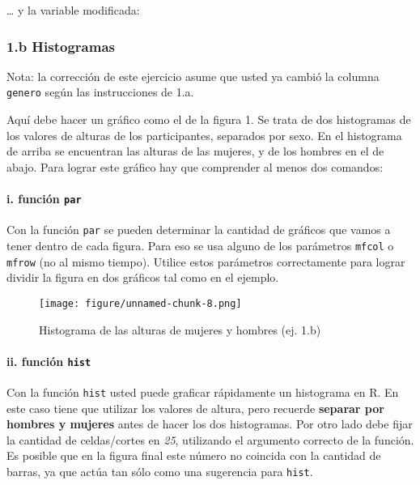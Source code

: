 \documentclass[]{article}
\makeatletter
\newenvironment{Shaded}{}{}
\newcommand{\DecValTok}[1]{\textcolor[rgb]{0.25,0.63,0.44}{{#1}}}
\newcommand{\StringTok}[1]{\textcolor[rgb]{0.25,0.44,0.63}{{#1}}}
\newcommand{\NormalTok}[1]{{#1}}
\def\maxwidth{\ifdim\Gin@nat@width>\linewidth\linewidth
\else\Gin@nat@width\fi}
\let\Oldincludegraphics\includegraphics
\renewcommand{\includegraphics}[1]{\Oldincludegraphics[width=\maxwidth]{#1}}
\makeatother
\begin{document}
\ldots{} y la variable modificada:

\begin{Shaded}
\end{Shaded}

\subsubsection{1.b Histogramas}

Nota: la corrección de este ejercicio asume que usted ya cambió la
columna \texttt{genero} según las instrucciones de 1.a.

Aquí debe hacer un gráfico como el de la figura 1. Se trata de dos
histogramas de los valores de alturas de los participantes, separados
por sexo. En el histograma de arriba se encuentran las alturas de las
mujeres, y de los hombres en el de abajo. Para lograr este gráfico hay
que comprender al menos dos comandos:

\paragraph{i. función \texttt{par}}

Con la función \texttt{par} se pueden determinar la cantidad de gráficos
que vamos a tener dentro de cada figura. Para eso se usa alguno de los
parámetros \texttt{mfcol} o \texttt{mfrow} (no al mismo tiempo). Utilice
estos parámetros correctamente para lograr dividir la figura en dos
gráficos tal como en el ejemplo.

\begin{figure}[htbp]
\centering
\texttt{[image: figure/unnamed-chunk-8.png]}
\caption{Histograma de las alturas de mujeres y hombres (ej. 1.b)}
\end{figure}

\paragraph{ii. función \texttt{hist}}

Con la función \texttt{hist} usted puede graficar rápidamente un
histograma en R. En este caso tiene que utilizar los valores de altura,
pero recuerde \textbf{separar por hombres y mujeres} antes de hacer los
dos histogramas. Por otro lado debe fijar la cantidad de celdas/cortes
en \emph{25}, utilizando el argumento correcto de la función. Es posible
que en la figura final este número no coincida con la cantidad de
barras, ya que actúa tan sólo como una sugerencia para \texttt{hist}.
\end{document}
